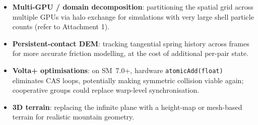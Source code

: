 \begin{itemize}
  \item \textbf{Multi-GPU / domain decomposition}: partitioning the spatial
        grid across multiple GPUs via halo exchange for simulations with 
        very large shell particle counts (refer to Attachment 1).
  \item \textbf{Persistent-contact DEM}: tracking tangential spring history
        across frames for more accurate friction modelling, at the cost of
        additional per-pair state.
  \item \textbf{Volta+ optimisations}: on SM~7.0+, hardware
        \texttt{atomicAdd(float)} eliminates CAS loops, potentially making
        symmetric collision viable again; cooperative groups could replace
        warp-level synchronisation.
  \item \textbf{3D terrain}: replacing the infinite plane with a height-map
        or mesh-based terrain for realistic mountain geometry.
\end{itemize}
